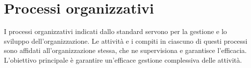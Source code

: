 \section{Processi organizzativi}
I processi organizzativi indicati dallo standard \cite{bib:ISO12207_1997} servono per la gestione e lo sviluppo dell'organizzazione.
Le attività e i compiti in ciascuno di questi processi sono affidati all'organizzazione stessa, che ne supervisiona e garantisce l'efficacia. L'obiettivo principale è garantire un'efficace gestione complessiva delle attività.



